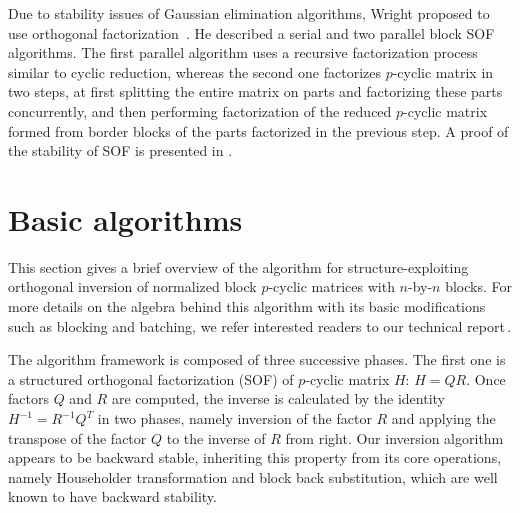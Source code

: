 \documentclass{llncs}
\newcommand{\editDel}[1]{}
\begin{document}
Due to stability issues of Gaussian elimination algorithms, 
Wright proposed to use orthogonal factorization~\cite{Wright92BSOF}.
He described a serial and two parallel block SOF algorithms. 
The first parallel algorithm uses a recursive factorization 
process similar to cyclic reduction,
whereas the second one factorizes $p$-cyclic matrix in two steps,
at first splitting the entire matrix on parts and factorizing these 
parts concurrently, and then performing factorization of the reduced 
$p$-cyclic matrix formed from border blocks of the parts factorized 
in the previous step.  A proof of the stability of 
SOF is presented in \cite{Wright92BSOF}.

\section{Basic algorithms}
\label{sec:algorithm}

This section gives a brief overview of the algorithm for 
structure-exploiting orthogonal inversion 
of normalized block $p$-cyclic matrices with $n$-by-$n$ blocks.
For more details on the algebra behind this algorithm 
with its basic modifications such as blocking and batching, 
we refer interested readers to our technical report\,\cite{GogolenkoBai13}.

The algorithm framework is composed of three successive phases. 
The first one is a structured orthogonal factorization (SOF) 
of $p$-cyclic matrix $H$: $H = QR$.
Once factors $Q$ and $R$ are computed, 
the inverse is calculated by the identity $H^{-1} = R^{-1}Q^T$
in two phases, namely inversion of the factor $R$ 
and applying the transpose of the factor $Q$ to the 
inverse of $R$ from right.
Our inversion algorithm appears to be backward stable,
inheriting this property from its core operations, 
namely Householder transformation and block back substitution, 
which are well known to have backward stability.
\end{document}
